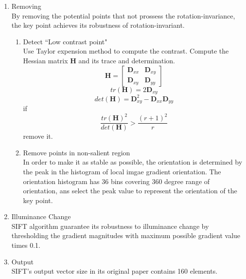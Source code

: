 \documentclass[11pt]{article}
\newcommand{\mtx}[1]{\bm{#1}}
\begin{document}
\begin{enumerate}
\item Removing \\
By removing the potential points that not prossess the rotation-invariance, the key point achieves its robustness of rotation-invariant.
\begin{enumerate}
\item Detect ``Low contrast point" \\
Use Taylor expension method to compute the contrast.
Compute the Hessian matrix $\mtx H$ and its trace and determination.
\begin{equation}
\mtx H=\begin{bmatrix} \mtx D_{ xx } &\mtx D_{ xy } \\\mtx D_{ xy } &\mtx D_{ yy } \end{bmatrix}
\end{equation}
\begin{equation}
tr(\mtx H)=2 \mtx D_{ xy }
\end{equation}
\begin{equation}
det(\mtx H)=\mtx D_{ xy }^2-\mtx D_{ xx }\mtx D_{ yy }
\end{equation}
if 
\begin{equation}
\frac { tr(\mtx H)^2 }{ det(\mtx H) } > \frac { (r+1)^2 }{ r }
\end{equation}
remove it.

\item Remove points in non-salient region\\
In order to make it as stable as possible, the orientation is determined by the peak in the histogram of local imgae gradient orientation. The orientation histogram has 36 bins covering 360 degree range of orientation, ans select the peak value to represent the orientation of the key point.
\end{enumerate} 

\item Illuminance Change\\
SIFT algorithm guarantee its robustness to illuminance change by thresholding the gradient magnitudes with maximum possible gradient value times 0.1. 


\item Output \\
SIFT’s output vector size in its original paper contains 160 elements.
\end{enumerate} 


\end{document}

